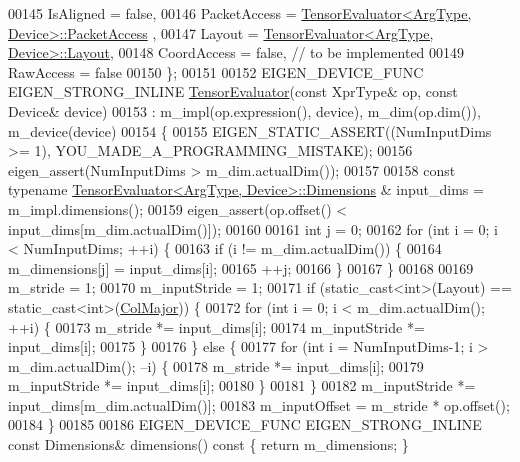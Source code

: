 \begin{DoxyCode}
00145     IsAligned = \textcolor{keyword}{false},
00146     PacketAccess = \hyperlink{struct_eigen_1_1_tensor_evaluator}{TensorEvaluator<ArgType, Device>::PacketAccess}
      ,
00147     Layout = \hyperlink{struct_eigen_1_1_tensor_evaluator}{TensorEvaluator<ArgType, Device>::Layout},
00148     CoordAccess = \textcolor{keyword}{false},  \textcolor{comment}{// to be implemented}
00149     RawAccess = \textcolor{keyword}{false}
00150   \};
00151 
00152   EIGEN\_DEVICE\_FUNC EIGEN\_STRONG\_INLINE \hyperlink{struct_eigen_1_1_tensor_evaluator}{TensorEvaluator}(\textcolor{keyword}{const} XprType& op, \textcolor{keyword}{const} Device& 
      device)
00153       : m\_impl(op.expression(), device), m\_dim(op.dim()), m\_device(device)
00154   \{
00155     EIGEN\_STATIC\_ASSERT((NumInputDims >= 1), YOU\_MADE\_A\_PROGRAMMING\_MISTAKE);
00156     eigen\_assert(NumInputDims > m\_dim.actualDim());
00157 
00158     \textcolor{keyword}{const} \textcolor{keyword}{typename} \hyperlink{struct_eigen_1_1_tensor_evaluator}{TensorEvaluator<ArgType, Device>::Dimensions}
      & input\_dims = m\_impl.dimensions();
00159     eigen\_assert(op.offset() < input\_dims[m\_dim.actualDim()]);
00160 
00161     \textcolor{keywordtype}{int} j = 0;
00162     \textcolor{keywordflow}{for} (\textcolor{keywordtype}{int} i = 0; i < NumInputDims; ++i) \{
00163       \textcolor{keywordflow}{if} (i != m\_dim.actualDim()) \{
00164         m\_dimensions[j] = input\_dims[i];
00165         ++j;
00166       \}
00167     \}
00168 
00169     m\_stride = 1;
00170     m\_inputStride = 1;
00171     \textcolor{keywordflow}{if} (static\_cast<int>(Layout) == \textcolor{keyword}{static\_cast<}\textcolor{keywordtype}{int}\textcolor{keyword}{>}(\hyperlink{group__enums_ggaacded1a18ae58b0f554751f6cdf9eb13a0cbd4bdd0abcfc0224c5fcb5e4f6669a}{ColMajor})) \{
00172       \textcolor{keywordflow}{for} (\textcolor{keywordtype}{int} i = 0; i < m\_dim.actualDim(); ++i) \{
00173         m\_stride *= input\_dims[i];
00174         m\_inputStride *= input\_dims[i];
00175       \}
00176     \} \textcolor{keywordflow}{else} \{
00177       \textcolor{keywordflow}{for} (\textcolor{keywordtype}{int} i = NumInputDims-1; i > m\_dim.actualDim(); --i) \{
00178         m\_stride *= input\_dims[i];
00179         m\_inputStride *= input\_dims[i];
00180       \}
00181     \}
00182     m\_inputStride *= input\_dims[m\_dim.actualDim()];
00183     m\_inputOffset = m\_stride * op.offset();
00184   \}
00185 
00186   EIGEN\_DEVICE\_FUNC EIGEN\_STRONG\_INLINE \textcolor{keyword}{const} Dimensions& dimensions()\textcolor{keyword}{ const }\{ \textcolor{keywordflow}{return} m\_dimensions; \}

\end{DoxyCode}
